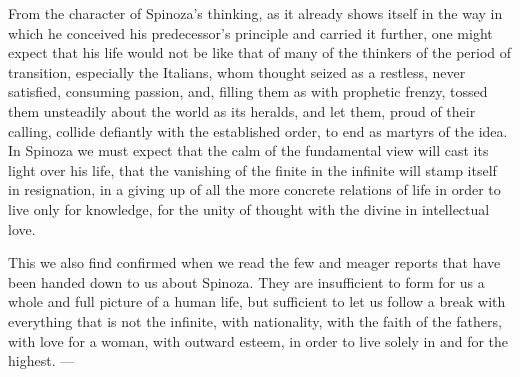 \documentclass[12pt,a4paper,openany]{book}
\begin{document}
From the character of Spinoza's thinking, as it already shows itself in
the way in which he conceived his predecessor's principle and carried it
further, one might expect that his life would not be like that of many
of the thinkers of the period of transition, especially the Italians,
whom thought seized as a restless, never satisfied, consuming passion,
and, filling them as with prophetic frenzy, tossed them unsteadily about
the world as its heralds, and let them, proud of their calling, collide
defiantly with the established order, to end as martyrs of the idea. In
Spinoza we must expect that the calm of the fundamental view will cast
its light over his life, that the vanishing of the finite in the
infinite will stamp itself in resignation, in a giving up of all the
more concrete relations of life in order to live only for knowledge, for
the unity of thought with the divine in intellectual love.

This we also find confirmed when we read the few and meager reports
that have been handed down to us about Spinoza. They are insufficient to
form for us a whole and full picture of a human life, but sufficient to
let us follow a break with everything that is not the infinite, with
nationality, with the faith of the fathers, with love for a woman, with
outward esteem, in order to live solely in and for the highest. ---
\end{document}
